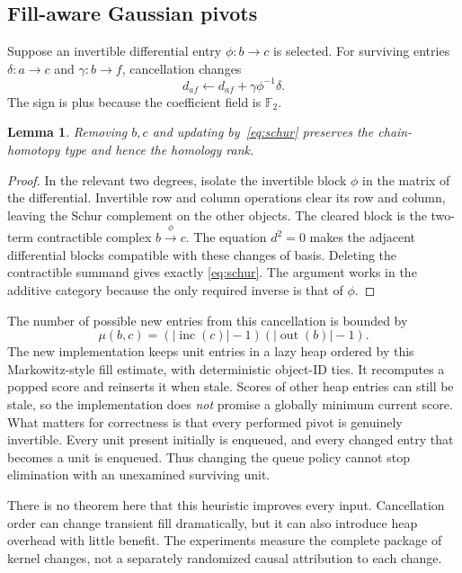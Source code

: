 \documentclass[11pt]{article}
\newtheorem{lemma}[theorem]{Lemma}
\theoremstyle{definition}\newtheorem{definition}[theorem]{Definition}
\theoremstyle{remark}\newtheorem{remark}[theorem]{Remark}
\newcommand{\F}{\mathbb F_2}
\begin{document}
\subsection{Fill-aware Gaussian pivots}
Suppose an invertible differential entry $\phi:b\to c$ is selected. For
surviving entries $\delta:a\to c$ and $\gamma:b\to f$, cancellation changes
\begin{equation}\label{eq:schur}
 d_{af}\longleftarrow d_{af}+\gamma\phi^{-1}\delta.
\end{equation}
The sign is plus because the coefficient field is $\F$.

\begin{lemma}\label{lem:cancel}
Removing $b,c$ and updating by~\eqref{eq:schur} preserves the chain-homotopy
type and hence the homology rank.
\end{lemma}
\begin{proof}
In the relevant two degrees, isolate the invertible block $\phi$ in the
matrix of the differential. Invertible row and column operations clear its
row and column, leaving the Schur complement on the other objects. The cleared
block is the two-term contractible complex $b\xrightarrow{\phi}c$.
The equation $d^2=0$ makes the adjacent differential blocks compatible with
these changes of basis. Deleting the contractible summand gives exactly
\eqref{eq:schur}. The argument works in the additive category because the
only required inverse is that of $\phi$.
\end{proof}
The number of possible new entries from this cancellation is bounded by
\[
 \mu(b,c)=(|\operatorname{inc}(c)|-1)(|\operatorname{out}(b)|-1).
\]
The new implementation keeps unit entries in a lazy heap ordered by this
Markowitz-style fill estimate, with deterministic object-ID ties. It recomputes
a popped score and reinserts it when stale. Scores of other heap entries can
still be stale, so the implementation does \emph{not} promise a globally
minimum current score. What matters for correctness is that every performed
pivot is genuinely invertible. Every unit present initially is enqueued, and
every changed entry that becomes a unit is enqueued. Thus changing the queue
policy cannot stop elimination with an unexamined surviving unit.

There is no theorem here that this heuristic improves every input. Cancellation
order can change transient fill dramatically, but it can also introduce heap
overhead with little benefit. The experiments measure the complete package of
kernel changes, not a separately randomized causal attribution to each change.
\end{document}
